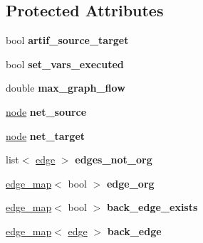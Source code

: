 \subsection*{Protected Attributes}
\begin{DoxyCompactItemize}
\item 
\mbox{\label{classmaxflow__pp_a21263af726420d377e404d816f31ed45}} 
bool {\bfseries artif\+\_\+source\+\_\+target}
\item 
\mbox{\label{classmaxflow__pp_a6642619150b9c12790df2171cfa2c05f}} 
bool {\bfseries set\+\_\+vars\+\_\+executed}
\item 
\mbox{\label{classmaxflow__pp_abdda1871e70fd2de0f2006eff57dc94e}} 
double {\bfseries max\+\_\+graph\+\_\+flow}
\item 
\mbox{\label{classmaxflow__pp_a20f2d05465acc2d7b777ea8025d12003}} 
\mbox{\hyperlink{classnode}{node}} {\bfseries net\+\_\+source}
\item 
\mbox{\label{classmaxflow__pp_a10f0b047011e04cb4816a824da5b7892}} 
\mbox{\hyperlink{classnode}{node}} {\bfseries net\+\_\+target}
\item 
\mbox{\label{classmaxflow__pp_a15710242a1285c21811768ea85855004}} 
list$<$ \mbox{\hyperlink{classedge}{edge}} $>$ {\bfseries edges\+\_\+not\+\_\+org}
\item 
\mbox{\label{classmaxflow__pp_aca9ce457300e11b97cec3446315fda1c}} 
\mbox{\hyperlink{classedge__map}{edge\+\_\+map}}$<$ bool $>$ {\bfseries edge\+\_\+org}
\item 
\mbox{\label{classmaxflow__pp_a50e9c82f1e720b8340ea4dc6d438f110}} 
\mbox{\hyperlink{classedge__map}{edge\+\_\+map}}$<$ bool $>$ {\bfseries back\+\_\+edge\+\_\+exists}
\item 
\mbox{\label{classmaxflow__pp_a9fdef5a86459eaf9634737094f3de250}} 
\mbox{\hyperlink{classedge__map}{edge\+\_\+map}}$<$ \mbox{\hyperlink{classedge}{edge}} $>$ {\bfseries back\+\_\+edge}
\item 
\mbox{\label{classmaxflow__pp_af3cdc4999a86322271a80b1855d58629}} 

\end{DoxyCompactItemize}
